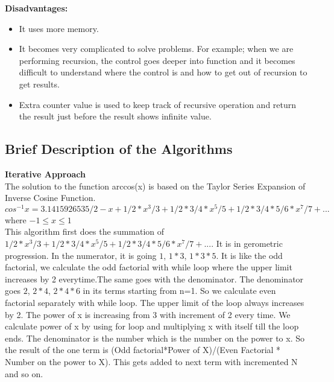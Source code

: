 \documentclass[12pt]{article}
\begin{document}
\textbf{Disadvantages:}
\begin{itemize}
    \item It uses more memory.
    \item It becomes very complicated to solve problems. For example; when we are performing recursion, the control goes deeper into function and it becomes difficult to understand where the control is and how to get out of recursion to get results.
    \item Extra counter value is used to keep track of recursive operation and return the result just before the result shows infinite value.
\end{itemize}

\subsection{Brief Description of the Algorithms}
\textbf{Iterative Approach}\\
The solution to the function arccos(x) is based on the Taylor Series Expansion of Inverse Cosine Function.\\
$cos^{-1}x = 3.1415926535/2 -  x + 1/2 * x^3/3 + 1/2 *3/4 *x^5/5 + 1/2 * 3/4 *5/6 * x^7/7 + ... $ where $-1 \leq x \leq 1$\\
This algorithm first does the summation of $1/2 * x^3/3 + 1/2 *3/4 *x^5/5 + 1/2 * 3/4 *5/6 * x^7/7 + ... $. It is in gerometric progression. In the numerator, it is going $1$, $1*3$, $1*3*5$. It is like the odd factorial, we calculate the odd factorial with while loop where the upper limit increases by 2 everytime.The same goes with the denominator. The denominator goes $2$, $2*4$, $2*4*6$ in its terms starting from n=1. So we calculate even factorial separately with while loop. The upper limit of the loop always increases by 2. The power of x is increasing from 3 with increment of 2 every time. We calculate power of x by using for loop and multiplying x with itself till the loop ends. The denominator is the number which is the number on the power to x. So the result of the one term is (Odd factorial*Power of X)/(Even Factorial * Number on the power to X). This gets added to next term with incremented N and so on.
\end{document}

